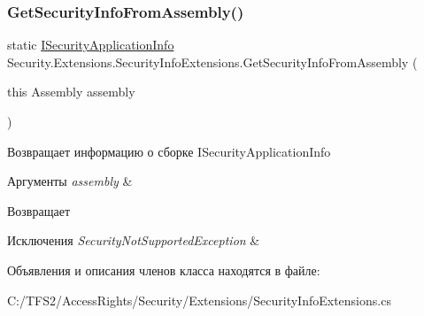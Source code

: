 \subsubsection{\texorpdfstring{Get\+Security\+Info\+From\+Assembly()}{GetSecurityInfoFromAssembly()}}
{\footnotesize\ttfamily static \hyperlink{interface_security_1_1_interfaces_1_1_i_security_application_info}{I\+Security\+Application\+Info} Security.\+Extensions.\+Security\+Info\+Extensions.\+Get\+Security\+Info\+From\+Assembly (\begin{DoxyParamCaption}\item[{this Assembly}]{assembly }\end{DoxyParamCaption})\hspace{0.3cm}{\ttfamily [static]}}



Возвращает информацию о сборке I\+Security\+Application\+Info 


\begin{DoxyParams}{Аргументы}
{\em assembly} & \\
\hline
\end{DoxyParams}
\begin{DoxyReturn}{Возвращает}

\end{DoxyReturn}

\begin{DoxyExceptions}{Исключения}
{\em Security\+Not\+Supported\+Exception} & \\
\hline
\end{DoxyExceptions}


Объявления и описания членов класса находятся в файле\+:\begin{DoxyCompactItemize}
\item 
C\+:/\+T\+F\+S2/\+Access\+Rights/\+Security/\+Extensions/Security\+Info\+Extensions.\+cs\end{DoxyCompactItemize}
